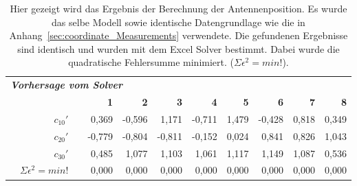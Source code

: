 \begin{table}[h]
  \small \caption{Hier gezeigt wird das Ergebnis der Berechnung der Antennenposition. Es wurde das selbe Modell sowie identische Datengrundlage wie die in Anhang~\ref{sec:coordinate_Measurements} verwendete. Die gefundenen Ergebnisse sind identisch und wurden mit dem Excel Solver bestimmt. Dabei wurde die quadratische Fehlersumme minimiert. ($\Sigma\epsilon^2 = min!$).}
    \vspace{0.5cm}
    \begin{tabular}{r|rrr|r|r|r|r|rrr}

    \multicolumn{11}{l}{\textit{\textbf{Vorhersage vom Solver}}} \\
    \multicolumn{1}{r}{} &       &       & \multicolumn{1}{r}{\textbf{1}} & \multicolumn{1}{r}{\textbf{2}} & \multicolumn{1}{r}{\textbf{3}} & \multicolumn{1}{r}{\textbf{4}} & \multicolumn{1}{r}{\textbf{5}} & \textbf{6} & \textbf{7} & \textbf{8} \\
\cline{2-11}    \multicolumn{1}{r}{} & $c_{10}'$ &       & \multicolumn{1}{r}{0,369} & \multicolumn{1}{r}{-0,596} & \multicolumn{1}{r}{1,171} & \multicolumn{1}{r}{-0,711} & \multicolumn{1}{r}{1,479} & -0,428 & 0,818 & 0,349 \\
    \multicolumn{1}{r}{} & $c_{20}'$ &       & \multicolumn{1}{r}{-0,779} & \multicolumn{1}{r}{-0,804} & \multicolumn{1}{r}{-0,811} & \multicolumn{1}{r}{-0,152} & \multicolumn{1}{r}{0,024} & 0,841 & 0,826 & 1,043 \\
    \multicolumn{1}{r}{} & {$c_{30}'$} &       & \multicolumn{1}{r}{0,485} & \multicolumn{1}{r}{1,077} & \multicolumn{1}{r}{1,103} & \multicolumn{1}{r}{1,061} & \multicolumn{1}{r}{1,117} & 1,149 & 1,087 & 0,536 \\
    \multicolumn{1}{r}{} & $\Sigma\epsilon^2=min!$ &       & \multicolumn{1}{r}{0,000} & \multicolumn{1}{r}{0,000} & \multicolumn{1}{r}{0,000} & \multicolumn{1}{r}{0,000} & \multicolumn{1}{r}{0,000} & 0,000 & 0,000 & 0,000 \\

\end{tabular}
\end{table}
